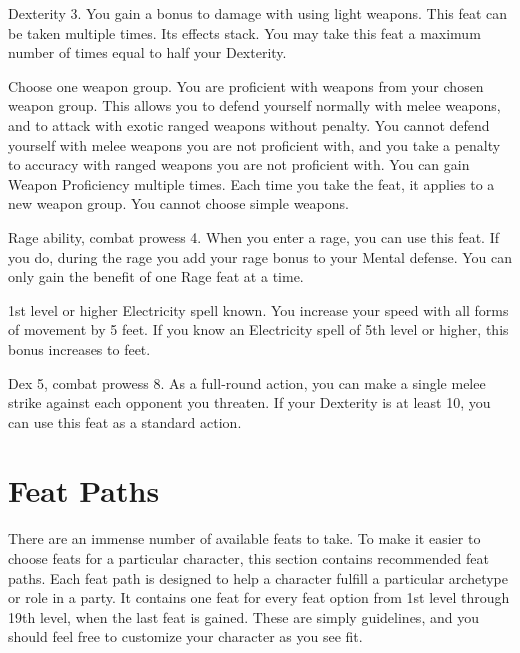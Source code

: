 \featpre Dexterity 3.
\featben You gain a  bonus to damage with  using light weapons.
 This feat can be taken multiple times. Its effects stack.
You may take this feat a maximum number of times equal to half your Dexterity.

Choose one weapon group.
\featben You are proficient with weapons from your chosen weapon group.
This allows you to defend yourself normally with melee weapons, and to attack with exotic ranged weapons without penalty.
You cannot defend yourself with melee weapons you are not proficient with, and you take a  penalty to accuracy with ranged weapons you are not proficient with.
You can gain Weapon Proficiency multiple times.
Each time you take the feat, it applies to a new weapon group.
You cannot choose simple weapons.

\featpres Rage ability, combat prowess 4.
\featben When you enter a rage, you can use this feat. If you do, during the rage you add your rage bonus to your Mental defense.
 You can only gain the benefit of one Rage feat at a time.


\featpre 1st level or higher Electricity spell known.
\featben You increase your speed with all forms of movement by 5 feet.
If you know an Electricity spell of 5th level or higher, this bonus increases to  feet.

\featpres Dex 5, combat prowess 8.
\featben As a full-round action, you can make a single melee strike against each opponent you threaten.
If your Dexterity is at least 10, you can use this feat as a standard action.

\section{Feat Paths}

    There are an immense number of available feats to take.
    To make it easier to choose feats for a particular character, this section contains recommended feat paths.
    Each feat path is designed to help a character fulfill a particular archetype or role in a party.
    It contains one feat for every feat option from 1st level through 19th level, when the last feat is gained.
    These are simply guidelines, and you should feel free to customize your character as you see fit.

